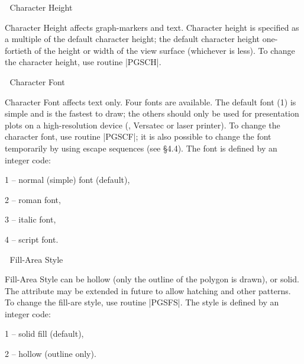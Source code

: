 
\beginsection Character Height

Character Height affects graph-markers and text.  Character height is 
specified as a multiple of the default character height; the default
character height one-fortieth of the height or width of the view surface
(whichever is less).  To change the character height, use routine 
|PGSCH|.


\beginsection Character Font

Character Font affects text only. Four fonts are available. The default
font (1) is simple and is the fastest to draw; the others should only be
used for presentation plots on a high-resolution device (\eg, Versatec
or laser printer).  To change the character font, use routine |PGSCF|; 
it is also possible to change the font temporarily by using 
escape sequences (see \S 4.4). The
font is defined by an integer code: 
\item{1} -- normal (simple) font (default),
\item{2} -- roman font,
\item{3} -- italic font,
\item{4} -- script font.


\beginsection Fill-Area Style

Fill-Area Style can be hollow (only the outline of the polygon is
drawn), or solid. The attribute may be extended in future to allow
hatching and other patterns.  To change the fill-are style, use routine
|PGSFS|.  The style is defined by an integer code:
\item{1} -- solid fill (default),
\item{2} -- hollow (outline only).

\endchapter
